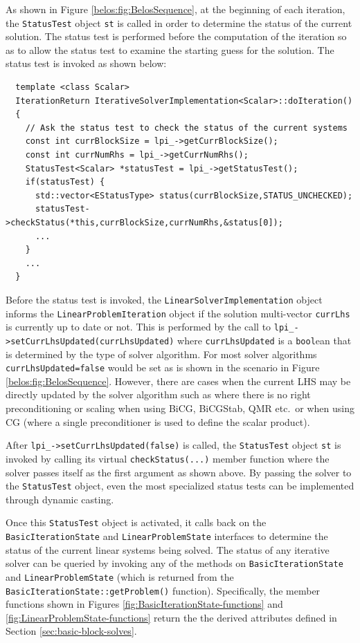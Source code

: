 \documentclass[pdf,ps2pdf,11pt]{SANDreport}
\begin{document}
\begin{enumerate}
As shown in Figure {}\ref{belos:fig:BelosSequence}, at the beginning
of each iteration, the {}\texttt{Status\-Test} object {}\texttt{st} is
called in order to determine the status of the current solution.  The
status test is performed before the computation of the iteration so as
to allow the status test to examine the starting guess for the
solution.  The status test is invoked as shown below:

{\scriptsize\begin{verbatim}
  template <class Scalar>
  IterationReturn IterativeSolverImplementation<Scalar>::doIteration()
  {
    // Ask the status test to check the status of the current systems
    const int currBlockSize = lpi_->getCurrBlockSize();
    const int currNumRhs = lpi_->getCurrNumRhs();
    StatusTest<Scalar> *statusTest = lpi_->getStatusTest();
    if(statusTest) {
      std::vector<EStatusType> status(currBlockSize,STATUS_UNCHECKED);
      statusTest->checkStatus(*this,currBlockSize,currNumRhs,&status[0]);
      ...
    }
    ...
  }
\end{verbatim}}

Before the status test is invoked, the
{}\texttt{Linear\-Solver\-Implementation} object informs the
{}\texttt{Linear\-Problem\-Iteration} object if the solution
multi-vector {}\texttt{currLhs} is currently up to date or not.  This
is performed by the call to
{}\texttt{lpi\_->\-set\-Curr\-Lhs\-Updated(\-curr\-Lhs\-Updated\-)}
where {}\texttt{curr\-Lhs\-Updated} is a {}\texttt{bool}ean that is
determined by the type of solver algorithm.  For most solver
algorithms {}\texttt{curr\-Lhs\-Updated=false} would be set as is
shown in the scenario in Figure {}\ref{belos:fig:BelosSequence}.
However, there are cases when the current LHS may be directly updated
by the solver algorithm such as where there is no right
preconditioning or scaling when using BiCG, BiCGStab, QMR etc.~or when
using CG (where a single preconditioner is used to define the scalar
product).

After
{}\texttt{lpi\_->\-set\-Curr\-Lhs\-Updated(\-false\-)} is
called, the {}\texttt{Status\-Test} object {}\texttt{st} is invoked by
calling its virtual {}\texttt{checkStatus(...)} member function where
the solver passes itself as the first argument as shown above. By
passing the solver to the {}\texttt{Status\-Test} object, even the
most specialized status tests can be implemented through dynamic
casting.

Once this {}\texttt{Status\-Test} object is activated, it calls back
on the {}\texttt{Basic\-Iteration\-State} and
{}\texttt{Linear\-Problem\-State} interfaces to determine the status
of the current linear systems being solved.  The status of any
iterative solver can be queried by invoking any of the methods on
{}\texttt{Basic\-Iteration\-State} and
{}\texttt{Linear\-Problem\-State} (which is returned from the
{}\texttt{Basic\-Iteration\-State\-::get\-Problem()} function).
Specifically, the member functions shown in Figures
{}\ref{fig:BasicIterationState-functions} and
{}\ref{fig:LinearProblemState-functions} return the the derived
attributes defined in Section {}\ref{sec:basic-block-solves}.


\end{enumerate}
\end{document}
